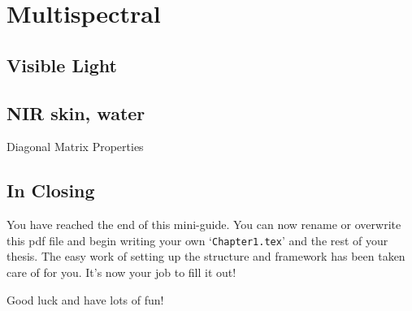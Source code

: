 \chapter{Multispectral} %

\label{Chapter6} %


\section{Visible Light}
\section{NIR skin, water}

\begin{compactitem}

\item Diagonal Matrix Properties
\end{compactitem}


\section{In Closing}

You have reached the end of this mini-guide. You can now rename or overwrite this pdf file and begin writing your own `\texttt{Chapter1.tex}' and the rest of your thesis. The easy work of setting up the structure and framework has been taken care of for you. It's now your job to fill it out!

Good luck and have lots of fun!

